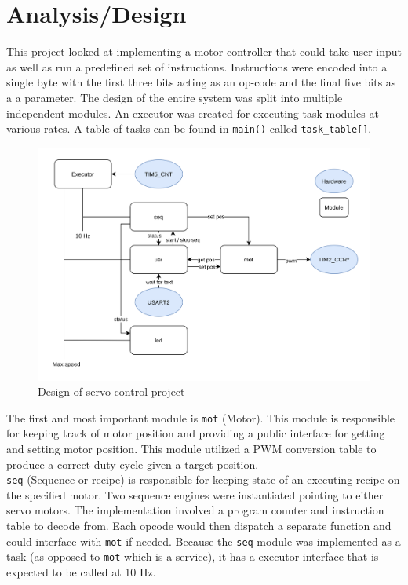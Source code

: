 \documentclass[CMPE]{KGCOEReport}
\def\code#1{\texttt{#1}}
\begin{document}
    \maketitle
    \section*{Analysis/Design}

    This project looked at implementing a motor controller that could take
    user input as well as run a predefined set of instructions. Instructions
    were encoded into a single byte with the first three bits acting as an
    op-code and the final five bits as a a parameter. The design of the entire
    system was split into multiple independent modules. An executor was created
    for executing task modules at various rates. A table of tasks can be found
    in \code{main()} called \code{task\_table[]}. \\
    
    \begin{figure}[h!]
      \centering
      \includegraphics[width=5.5in]{servo_proj_design}
      \caption{Design of servo control project}
      \label{fig:overview}
    \end{figure}
    
    The first and most
    important module is \code{mot} (Motor). This module is responsible for
    keeping track of motor position and providing a public interface for
    getting and setting motor position. This module utilized a PWM conversion
    table to produce a correct duty-cycle given a target position.\\

    \code{seq} (Sequence or recipe) is responsible for keeping state of an
    executing recipe on the specified motor. Two sequence engines were
    instantiated pointing to either servo motors. The implementation involved
    a program counter and instruction table to decode from.
    Each opcode would then dispatch a separate function and could interface
    with \code{mot} if needed. Because the \code{seq} module was implemented
    as a task (as opposed to \code{mot} which is a service), it has a executor
    interface that is expected to be called at 10 Hz.\\
\end{document}
